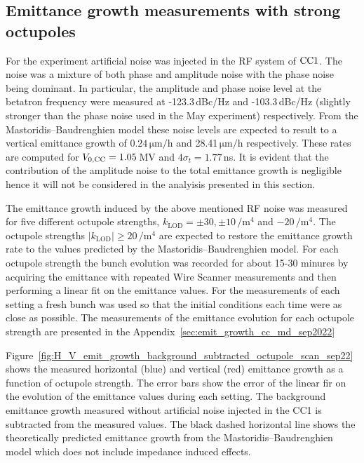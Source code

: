 \subsection{Emittance growth measurements with strong octupoles}\label{subsec:cc_md_sep}
For the experiment artificial noise was injected in the RF system of ${\mathrm{CC}}1$. The noise was a mixture of both phase and amplitude noise with the phase noise being dominant. In particular, the amplitude and phase noise level at the betatron frequency were measured at -123.3\,dBc/Hz and -103.3\,dBc/Hz (slightly stronger than the phase noise used in the May experiment) respectively. From the Mastoridis--Baudrenghien model these noise levels are expected to result to a vertical emittance growth of $0.24$\,$\mathrm{\mu m/h}$ and 28.41\,$\mathrm{\mu m/h}$ respectively. These rates are computed for ${V_\mathrm{0, CC}}=1.05$\,MV and $4\sigma_t=1.77$\,ns. It is evident that the contribution of the amplitude noise to the total emittance growth is negligible hence it will not be considered in the analyisis presented in this section.

The emittance growth induced by the above mentioned RF noise was measured for five different octupole strengths, $k_\mathrm{LOD}=\pm 30, \pm 10$\,$\mathrm{/m^4}$ and $-20$\,$\mathrm{/m^4}$. The octupole strengths $| k_\mathrm{LOD} | \geq 20$\,$\mathrm{/m^4}$ are expected to restore the emittance growth rate to the values predicted by the Mastoridis--Baudrenghien model. For each octupole strength the bunch evolution was recorded for about 15-30 minures by acquiring the emittance with repeated Wire Scanner measurements and then performing a linear fit on the emittance values. For the measurements of each setting a fresh bunch was used so that the initial conditions each time were as close as possible. The measurements of the emittance evolution for each octupole strength are presented in the Appendix~\ref{sec:emit_growth_cc_md_sep2022}


Figure~\ref{fig:H_V_emit_growth_background_subtracted_octupole_scan_sep22} shows the measured horizontal (blue) and vertical (red) emittance growth as a function of octupole strength. The error bars show the error of the linear fir on the evolution of the emittance values during each setting. The background emittance growth measured without artificial noise injected in the CC1 is subtracted from the measured values. The black dashed horizontal line shows the theoretically predicted emittance growth from the Mastoridis--Baudrenghien model which does not include impedance induced effects.


